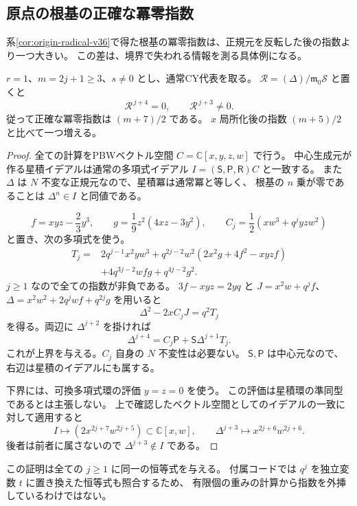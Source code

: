 \subsection{原点の根基の正確な冪零指数}
\label{subsec:global-origin-nilindex-v37}

系\ref{cor:origin-radical-v36}で得た根基の冪零指数は、正規元を反転した後の指数より一つ大きい。
この差は、境界で失われる情報を測る具体例になる。

\begin{theorem}[全環での原点の厚み]
\label{thm:global-origin-nilindex-v37}
$r=1$、$m=2j+1\ge3$、$s\ne0$ とし、通常CY代表を取る。
$\mathcal R=(\Delta)/\mathfrak m_0\mathcal S$ と置くと
\[
 \boxed{\mathcal R^{\,j+4}=0,\qquad
        \mathcal R^{\,j+3}\ne0.}
\]
従って正確な冪零指数は $(m+7)/2$ である。
$x$ 局所化後の指数 $(m+5)/2$ と比べて一つ増える。
\end{theorem}

\begin{proof}
全ての計算をPBWベクトル空間 $C=\mathbb C[x,y,z,w]$ で行う。
中心生成元が作る星積イデアルは通常の多項式イデアル
$I=(\mathsf S,\mathsf P,\mathsf R)C$ と一致する。
また $\Delta$ は $N$ 不変な正規元なので、星積冪は通常冪と等しく、
根基の $n$ 乗が零であることは $\Delta^n\in I$ と同値である。

\[
 f=xyz-\frac23y^3,\qquad
 g=\frac19z^2(4xz-3y^2),\qquad
 C_j=\frac12(xw^3+q^jyz w^2)
\]
と置き、次の多項式を使う。
\begin{align*}
 T_j={}&2q^{j-1}x^2yw^3
       +q^{2j-2}w^2(2x^2g+4f^2-xyzf)\\
      &+4q^{3j-2}wfg+q^{4j-2}g^2.
\end{align*}
$j\ge1$ なので全ての指数が非負である。
$3f-xyz=2yq$ と
$J=x^2w+q^jf$、$\Delta=x^2w^2+2q^jwf+q^{2j}g$ を用いると
\[
 \Delta^2-2xC_jJ=q^2T_j
\]
を得る。両辺に $\Delta^{j+2}$ を掛ければ
\begin{equation}
 \boxed{\Delta^{j+4}
      =C_j\mathsf P+\mathsf S\Delta^{j+1}T_j.}
 \label{eq:global-nilindex-certificate-v37}
\end{equation}
これが上界を与える。$C_j$ 自身の $N$ 不変性は必要ない。
$\mathsf S,\mathsf P$ は中心元なので、右辺は星積のイデアルにも属する。

下界には、可換多項式環の評価 $y=z=0$ を使う。
この評価は星積環の準同型であるとは主張しない。
上で確認したベクトル空間としてのイデアルの一致に対して適用すると
\[
 I\longmapsto(2x^{2j+7}w^{2j+5})\subset\mathbb C[x,w],
 \qquad
 \Delta^{j+3}\longmapsto x^{2j+6}w^{2j+6}.
\]
後者は前者に属さないので $\Delta^{j+3}\notin I$ である。
\end{proof}

この証明は全ての $j\ge1$ に同一の恒等式を与える。
付属コードでは $q^j$ を独立変数 $t$ に置き換えた恒等式も照合するため、
有限個の重みの計算から指数を外挿しているわけではない。
